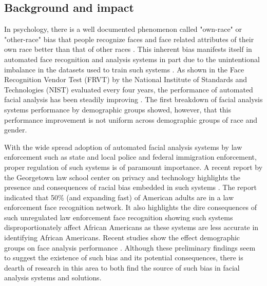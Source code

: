 \documentclass[11pt, oneside]{article}
\makeatletter
\let\@internalcite\cite
\def\cite{\def\citeauthoryear##1##2{##1, ##2}\@internalcite}
\makeatother
\begin{document}
\subsection{Background and impact}


In psychology, there is a well documented phenomenon called "own-race" or "other-race" bias that people recognize faces and face related attributes of their own race better than that of other races \cite{furl2002face}. This inherent bias manifests itself in automated face recognition and analysis systems in part due to the unintentional imbalance in the datasets used to train such systems \cite{phillips2011other}. As shown in the Face Recognition Vendor Test (FRVT) by the National Institute of Standards and Technologies (NIST) evaluated every four years, the performance of automated facial analysis has been steadily improving \cite{grother2010report}. The first breakdown of facial analysis systems performance by demographic groups \cite{phillips2011other} showed, however, that this performance improvement is not uniform across demographic groups of race and gender.

With the wide spread adoption of automated facial analysis systems by law enforcement such as state and local police and federal immigration enforcement, proper regulation of such systems is of paramount importance. A recent report by the Georgetown law school center on privacy and technology highlights the presence and consequences of racial bias embedded in such systems \cite{garvie2016perpetual}. The report indicated that 50\% (and expanding fast) of American adults are in a law enforcement face recognition network. It also highlights the dire consequences of such unregulated law enforcement face recognition showing such systems disproportionately affect African Americans as these systems are less accurate in identifying African Americans. Recent studies show the effect demographic groups on face analysis performance \cite{han2015demographic} \cite{farinella2012demographic} \cite{klare2012face}. Although these preliminary findings seem to suggest the existence of such bias and its potential consequences, there is dearth of research in this area to both find the source of such bias in facial analysis systems and solutions. 
\end{document}
